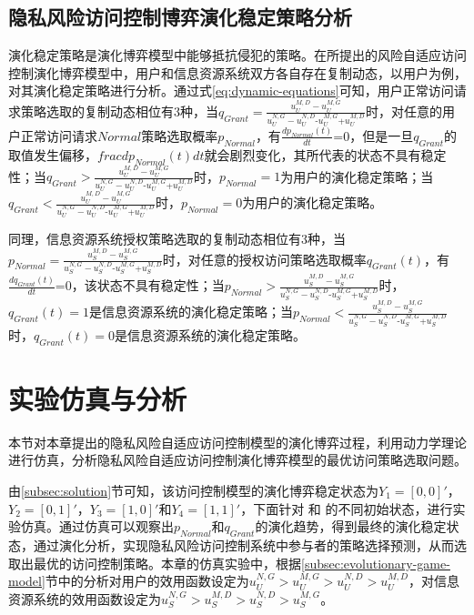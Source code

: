 \subsection{隐私风险访问控制博弈演化稳定策略分析}
演化稳定策略是演化博弈模型中能够抵抗侵犯的策略。在所提出的风险自适应访问控制演化博弈模型中，用户和信息资源系统双方各自存在复制动态，以用户为例，对其演化稳定策略进行分析。通过式\ref{eq:dynamic-equations}可知，用户正常访问请求策略选取的复制动态相位有3种，当${{q}_{Grant}}=\frac{u_{U}^{M,D}-u_{U}^{M,G}}{u_{U}^{N,G}-u_{U}^{N,D}\text{-}u_{U}^{M,G}\text{+}u_{U}^{M,D}}$时，对任意的用户正常访问请求$Normal$策略选取概率$p_{Normal}$，有$\frac{d{{p}_{Normal}}(t)}{dt}\text{=0}$，但是一旦$q_{Grant}$的取值发生偏移，$frac{d{{p}_{Normal}}(t)}{dt}$就会剧烈变化，其所代表的状态不具有稳定性；当${{q}_{Grant}}>\frac{u_{U}^{M,D}-u_{U}^{M,G}}{u_{U}^{N,G}-u_{U}^{N,D}\text{-}u_{U}^{M,G}\text{+}u_{U}^{M,D}}$时，$p_{Normal}= 1$为用户的演化稳定策略；当${{q}_{Grant}}<\frac{u_{U}^{M,D}-u_{U}^{M,G}}{u_{U}^{N,G}-u_{U}^{N,D}\text{-}u_{U}^{M,G}\text{+}u_{U}^{M,D}}$时，$p_{Normal}=0$为用户的演化稳定策略。

 同理，信息资源系统授权策略选取的复制动态相位有3种，当${{p}_{Normal}}=\frac{u_{S}^{M,D}-u_{S}^{M,G}}{u_{S}^{N,G}-u_{S}^{N,D}\text{-}u_{S}^{M,G}\text{+}u_{S}^{M,D}}$时，对任意的授权访问策略选取概率$q_{Grant}(t)$，有$\frac{d{{q}_{Grant}}(t)}{dt}\text{=0}$，该状态不具有稳定性；当${{p}_{Normal}}>\frac{u_{S}^{M,D}-u_{S}^{M,G}}{u_{S}^{N,G}-u_{S}^{N,D}\text{-}u_{S}^{M,G}\text{+}u_{S}^{M,D}}$时，$q_{Grant}(t)=1$是信息资源系统的演化稳定策略；当${{p}_{Normal}}<\frac{u_{S}^{M,D}-u_{S}^{M,G}}{u_{S}^{N,G}-u_{S}^{N,D}\text{-}u_{S}^{M,G}\text{+}u_{S}^{M,D}}$时，$q_{Grant}(t)=0$是信息资源系统的演化稳定策略。
 
 
 \section{实验仿真与分析}
本节对本章提出的隐私风险自适应访问控制模型的演化博弈过程，利用动力学理论进行仿真，分析隐私风险自适应访问控制演化博弈模型的最优访问策略选取问题。

 由\ref{subsec:solution}节可知，该访问控制模型的演化博弈稳定状态为${{Y}_{1}}=[0,0]'$，${{Y}_{2}}=[0,1]'$，${{Y}_{3}}=[1,0]'$和${{Y}_{4}}=[1,1]'$，下面针对 和 的不同初始状态，进行实验仿真。通过仿真可以观察出$p_{Normal}$和$q_{Grant}$的演化趋势，得到最终的演化稳定状态，通过演化分析，实现隐私风险访问控制系统中参与者的策略选择预测，从而选取出最优的访问控制策略。本章的仿真实验中，根据\ref{subsec:evolutionary-game-model}节中的分析对用户的效用函数设定为$u_{U}^{N,G}>u_{U}^{M,G}>u_{U}^{N,D}>u_{U}^{M,D}$，对信息资源系统的效用函数设定为$u_{S}^{N,G}>u_{S}^{M,D}>u_{S}^{N,D}>u_{S}^{M,G}$。

